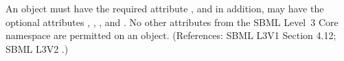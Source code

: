 An \Event object must have the required attribute
, and in addition, may have the optional
attributes , , , and .
No other attributes from the SBML Level~3 Core namespace are permitted on
an \Event object.  (References: SBML L3V1 Section 4.12; SBML L3V2 .)
